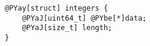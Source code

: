 \begin{Verbatim}[commandchars=@\[\]]
@PYay[struct] integers {
    @PYaJ[uint64_t] @PYbe[*]data;
    @PYaJ[size_t] length;
}
\end{Verbatim}
